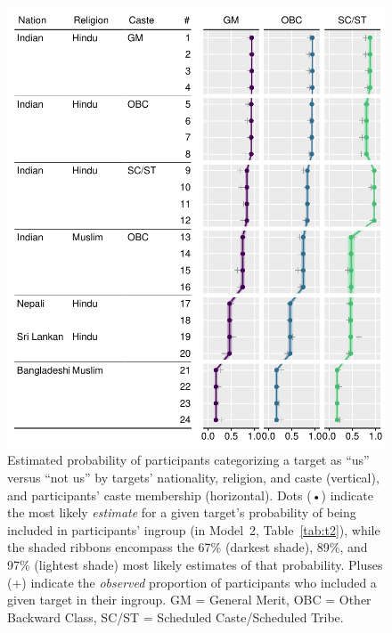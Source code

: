 \documentclass[12pt, a4paper]{article}
\begin{document}
\begin{figure}
\centering
\includegraphics[scale=1]{../figures/figure-3}
\caption{
Estimated probability of participants categorizing a target as ``us'' versus ``not us'' by targets' nationality, religion, and caste (vertical), and participants' caste membership (horizontal). Dots (•) indicate the most likely \emph{estimate} for a given target's probability of being included in participants' ingroup (in Model~2, Table~\ref{tab:t2}), while the shaded ribbons encompass the 67\% (darkest shade), 89\%, and 97\% (lightest shade) most likely estimates of that probability. Pluses (+) indicate the \emph{observed} proportion of participants who included a given target in their ingroup. GM = General Merit, OBC = Other Backward Class, SC/ST = Scheduled Caste/Scheduled Tribe. %
}
\label{fig:f3}
\end{figure}
\end{document}
